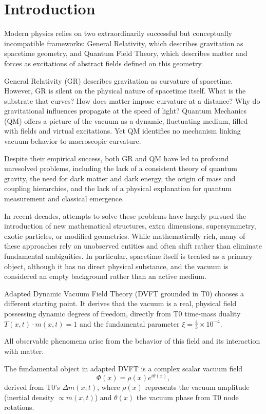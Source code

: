 \documentclass[12pt,a4paper]{article}
\begin{document}
	\section{Introduction}
	
	Modern physics relies on two extraordinarily successful but conceptually incompatible frameworks:
	General Relativity, which describes gravitation as spacetime geometry, and Quantum Field Theory, which describes matter and forces as excitations of abstract fields defined on this geometry.
	
	General Relativity (GR) describes gravitation as curvature of spacetime.
	However, GR is silent on the physical nature of spacetime itself.
	What is the substrate that curves?
	How does matter impose curvature at a distance?
	Why do gravitational influences propagate at the speed of light?
	Quantum Mechanics (QM)
	offers a picture of the vacuum as a dynamic, fluctuating medium, filled with fields and virtual excitations.
	Yet QM identifies no mechanism linking vacuum behavior to macroscopic curvature.
	
	Despite their empirical success, both GR and QM have led to profound unresolved problems, including
	the lack of a consistent theory of quantum gravity, the need for dark matter and dark energy, the origin
	of mass and coupling hierarchies, and the lack of a physical explanation for quantum measurement and
	classical emergence.
	
	In recent decades, attempts to solve these problems have largely pursued the introduction of new mathematical structures, extra dimensions, supersymmetry, exotic particles, or modified geometries.
	While mathematically rich, many of these approaches rely on unobserved entities and often shift rather than eliminate fundamental ambiguities.
	In particular, spacetime itself is treated as a primary object, although it has no direct physical substance, and the vacuum is considered an empty background rather than an active medium.
	
	Adapted Dynamic Vacuum Field Theory (DVFT grounded in T0) chooses a different starting point.
	It derives that the vacuum is a real, physical field possessing dynamic degrees of freedom, directly from T0 time-mass duality $T(x,t) \cdot m(x,t) = 1$ and the fundamental parameter $\xi = \frac{4}{3} \times 10^{-4}$.
	
	All observable phenomena arise from the behavior of this field and its interaction with matter.
	
	The fundamental object in adapted DVFT is a complex scalar vacuum field
	\[
	\Phi(x)=\rho(x)e^{i\theta(x)},
	\]
	derived from T0's $\Delta m(x,t)$, where $\rho(x)$ represents the vacuum amplitude (inertial density $\propto m(x,t)$) and $\theta(x)$
	the vacuum phase from T0 node rotations.
	
\end{document}
